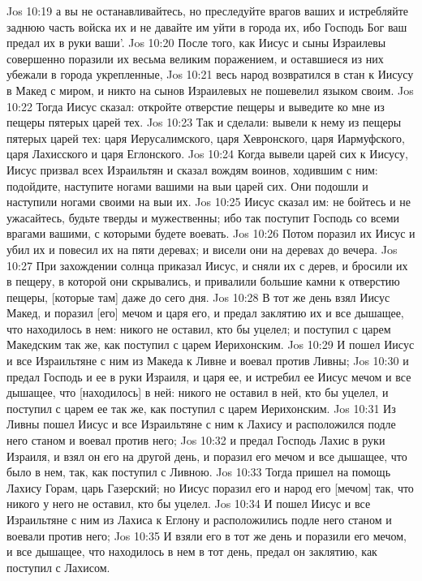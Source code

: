 Jos 10:19  а вы не останавливайтесь, но преследуйте врагов ваших и истребляйте заднюю часть войска их и не давайте им уйти в города их, ибо Господь Бог ваш предал их в руки ваши'.
Jos 10:20  После того, как Иисус и сыны Израилевы совершенно поразили их весьма великим поражением, и оставшиеся из них убежали в города укрепленные,
Jos 10:21  весь народ возвратился в стан к Иисусу в Макед с миром, и никто на сынов Израилевых не пошевелил языком своим.
Jos 10:22  Тогда Иисус сказал: откройте отверстие пещеры и выведите ко мне из пещеры пятерых царей тех.
Jos 10:23  Так и сделали: вывели к нему из пещеры пятерых царей тех: царя Иерусалимского, царя Хевронского, царя Иармуфского, царя Лахисского и царя Еглонского.
Jos 10:24  Когда вывели царей сих к Иисусу, Иисус призвал всех Израильтян и сказал вождям воинов, ходившим с ним: подойдите, наступите ногами вашими на выи царей сих. Они подошли и наступили ногами своими на выи их.
Jos 10:25  Иисус сказал им: не бойтесь и не ужасайтесь, будьте тверды и мужественны; ибо так поступит Господь со всеми врагами вашими, с которыми будете воевать.
Jos 10:26  Потом поразил их Иисус и убил их и повесил их на пяти деревах; и висели они на деревах до вечера.
Jos 10:27  При захождении солнца приказал Иисус, и сняли их с дерев, и бросили их в пещеру, в которой они скрывались, и привалили большие камни к отверстию пещеры, [которые там] даже до сего дня.
Jos 10:28  В тот же день взял Иисус Макед, и поразил [его] мечом и царя его, и предал заклятию их и все дышащее, что находилось в нем: никого не оставил, кто бы уцелел; и поступил с царем Македским так же, как поступил с царем Иерихонским.
Jos 10:29  И пошел Иисус и все Израильтяне с ним из Македа к Ливне и воевал против Ливны;
Jos 10:30  и предал Господь и ее в руки Израиля, и царя ее, и истребил ее Иисус мечом и все дышащее, что [находилось] в ней: никого не оставил в ней, кто бы уцелел, и поступил с царем ее так же, как поступил с царем Иерихонским.
Jos 10:31  Из Ливны пошел Иисус и все Израильтяне с ним к Лахису и расположился подле него станом и воевал против него;
Jos 10:32  и предал Господь Лахис в руки Израиля, и взял он его на другой день, и поразил его мечом и все дышащее, что было в нем, так, как поступил с Ливною.
Jos 10:33  Тогда пришел на помощь Лахису Горам, царь Газерский; но Иисус поразил его и народ его [мечом] так, что никого у него не оставил, кто бы уцелел.
Jos 10:34  И пошел Иисус и все Израильтяне с ним из Лахиса к Еглону и расположились подле него станом и воевали против него;
Jos 10:35  И взяли его в тот же день и поразили его мечом, и все дышащее, что находилось в нем в тот день, предал он заклятию, как поступил с Лахисом.
